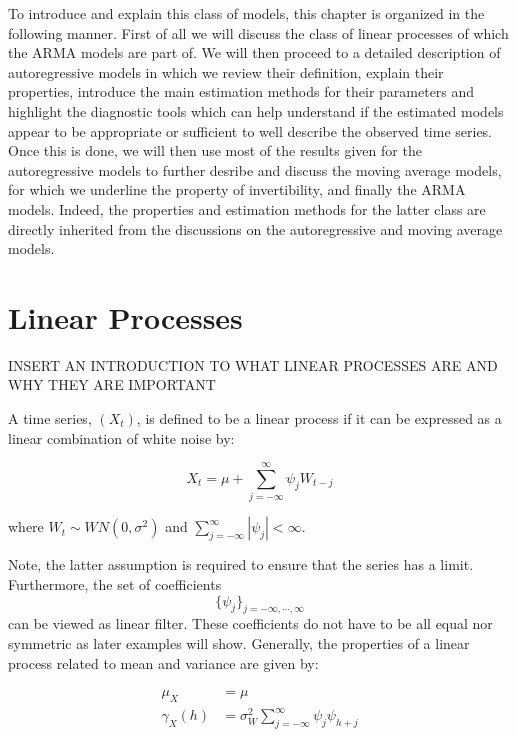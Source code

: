 \documentclass[]{book}
\theoremstyle{definition}
\theoremstyle{definition}
\theoremstyle{definition}
\theoremstyle{remark}
\let\BeginKnitrBlock\begin \let\EndKnitrBlock\end
\begin{document}
{To introduce and explain this class of models, this chapter is organized
in the following manner. First of all we will discuss the class of
linear processes of which the ARMA models are part of. We will then
proceed to a detailed description of autoregressive models in which we
review their definition, explain their properties, introduce the main
estimation methods for their parameters and highlight the diagnostic
tools which can help understand if the estimated models appear to be
appropriate or sufficient to well describe the observed time series.
Once this is done, we will then use most of the results given for the
autoregressive models to further desribe and discuss the moving average
models, for which we underline the property of invertibility, and
finally the ARMA models. Indeed, the properties and estimation methods
for the latter class are directly inherited from the discussions on the
autoregressive and moving average models.

\hypertarget{linear-processes}{%
\section{Linear Processes}\label{linear-processes}}

INSERT AN INTRODUCTION TO WHAT LINEAR PROCESSES ARE AND WHY THEY ARE
IMPORTANT

\BeginKnitrBlock{definition}[Linear Process]
\protect\hypertarget{def:lp}{}{\label{def:lp} {} }A time series, \((X_t)\), is defined to be a linear process if it
can be expressed as a linear combination of white noise by:

\[{X_t} = \mu + \sum\limits_{j =  - \infty }^\infty  {{\psi _j}{W_{t - j}}} \]

where \(W_t \sim WN(0, \sigma^2)\) and
\(\sum\limits_{j = - \infty }^\infty {\left| {{\psi _j}} \right|} < \infty\).
\EndKnitrBlock{definition}

Note, the latter assumption is required to ensure that the series has a
limit. Furthermore, the set of coefficients
\[{\{ {\psi _j}\} _{j =  - \infty , \cdots ,\infty }}\] can be viewed as
linear filter. These coefficients do not have to be all equal nor
symmetric as later examples will show. Generally, the properties of a
linear process related to mean and variance are given by:

\[\begin{aligned}
\mu_{X} &= \mu \\
\gamma_{X}(h) &= \sigma _W^2\sum\limits_{j =  - \infty }^\infty  {{\psi _j}{\psi _{h + j}}}
\end{aligned}\]

}
\end{document}
